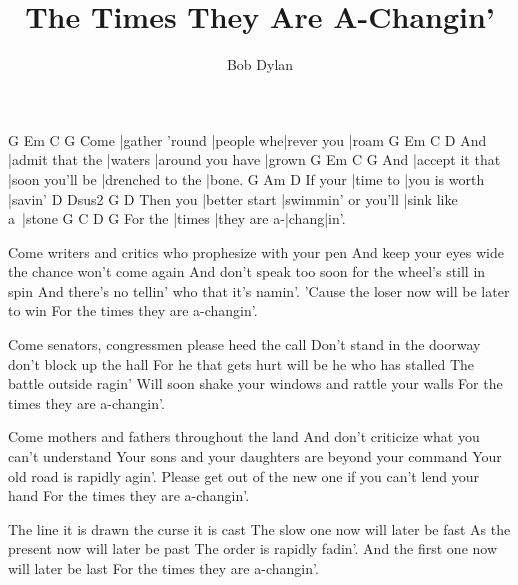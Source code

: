 \documentclass{song}
\title{The Times They Are A-Changin'}
\author{Bob Dylan}
\begin{document}
\strophe
     G              Em         C          G
Come |gather 'round |people whe|rever you |roam
    G               Em      C                D
And |admit that the |waters |around you have |grown
    G               Em              C                G
And |accept it that |soon you'll be |drenched to the |bone.
        G        Am            D
If your |time to |you is worth |savin'
         D             Dsus2             G            D
Then you |better start |swimmin' or you'll |sink like a~|stone
        G      C           D     G
For the |times |they are a-|chang|in'.
\endstrophe

\strophe*
Come writers and critics who prophesize with your pen
And keep your eyes wide the chance won't come again
And don't speak too soon for the wheel's still in spin
And there's no tellin' who that it's namin'.
'Cause the loser now will be later to win
For the times they are a-changin'.
\endstrophe

\strophe*
Come senators, congressmen please heed the call
Don't stand in the doorway don't block up the hall
For he that gets hurt will be he who has stalled
The battle outside ragin'
Will soon shake your windows and rattle your walls
For the times they are a-changin'.
\endstrophe

\strophe*
Come mothers and fathers throughout the land
And don't criticize what you can't understand
Your sons and your daughters are beyond your command
Your old road is rapidly agin'.
Please get out of the new one if you can't lend your hand
For the times they are a-changin'.
\endstrophe

\strophe*
The line it is drawn the curse it is cast
The slow one now will later be fast
As the present now will later be past
The order is rapidly fadin'.
And the first one now will later be last
For the times they are a-changin'.
\endstrophe

\end{document}
